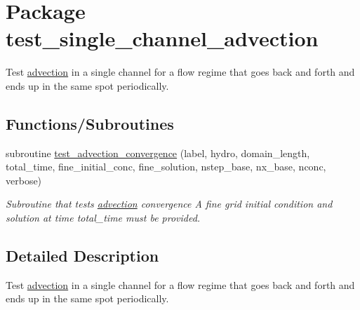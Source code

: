 \hypertarget{a00094}{
\section{Package test\_\-single\_\-channel\_\-advection}
\label{a00094}
}
Test \hyperlink{a00052}{advection} in a single channel for a flow regime that goes back and forth and ends up in the same spot periodically.  


\subsection*{Functions/Subroutines}
\begin{CompactItemize}
\item 
subroutine \hyperlink{a00094_8ef07d31d9dd8f57f48c1998b88cca1a}{test\_\-advection\_\-convergence} (label, hydro, domain\_\-length, total\_\-time, fine\_\-initial\_\-conc, fine\_\-solution, nstep\_\-base, nx\_\-base, nconc, verbose)
\begin{CompactList}\small\item\em Subroutine that tests \hyperlink{a00052}{advection} convergence A fine grid initial condition and solution at time total\_\-time must be provided. \item\end{CompactList}\end{CompactItemize}


\subsection{Detailed Description}
Test \hyperlink{a00052}{advection} in a single channel for a flow regime that goes back and forth and ends up in the same spot periodically. 




